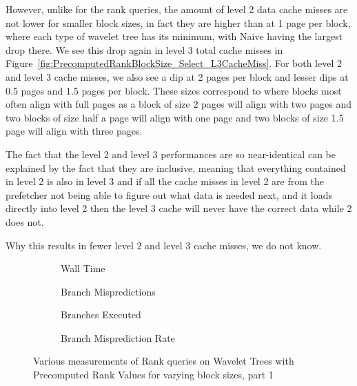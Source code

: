 However, unlike for the rank queries, the amount of level 2 data cache misses are not lower for smaller block sizes, in fact they are higher than at 1 page per block, where each type of wavelet tree has its minimum, with Naive having the largest drop there.
We see this drop again in level 3 total cache misses in Figure~\ref{fig:PrecomputedRankBlockSize_Select_L3CacheMiss}.
For both level 2 and level 3 cache misses, we also see a dip at 2 pages per block and lesser dips at 0.5 pages and 1.5 pages per block. 
These sizes correspond to where blocks most often align with full pages as a block of size 2 pages will align with two pages and two blocks of size half a page will align with one page and two blocks of size 1.5 page will align with three pages.

The fact that the level 2 and level 3 performances are so near-identical can be explained by the fact that they are inclusive, meaning that everything contained in level 2 is also in level 3 and
if all the cache misses in level 2 are from the prefetcher not being able to figure out what data is needed next, and it loads directly into level 2 then the level 3 cache will never have the correct data while 2 does not.

Why this results in fewer level 2 and level 3 cache misses, we do not know.





\begin{figure}\tiny

\begin{subfigure}{0.48\textwidth}
	
	\caption{Wall Time}
	\label{fig:PrecomputedRankBlockSize_Rank_WallTime}
\end{subfigure}
\hfill
\begin{subfigure}{0.48\textwidth}
	
	\caption{Branch Mispredictions}
	\label{fig:PrecomputedRankBlockSize_Rank_BranchMiss}
\end{subfigure}

\begin{subfigure}{0.48\textwidth}
	
	\caption{Branches Executed}
	\label{fig:PrecomputedRankBlockSize_Rank_BranchExe}
\end{subfigure}
\hfill	
\begin{subfigure}{0.48\textwidth}
	
	\caption{Branch Misprediction Rate}
	\label{fig:PrecomputedRankBlockSize_Rank_BranchMissRate}
\end{subfigure}
\caption{Various measurements of Rank queries on Wavelet Trees with Precomputed Rank Values for varying block sizes, part 1}
\label{fig:PrecomputedRankBlockSize_Rank}
\end{figure}

